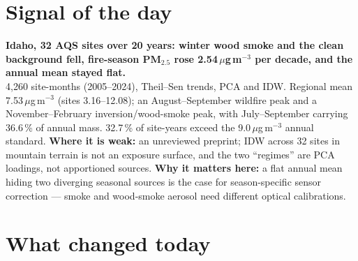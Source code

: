 \documentclass[10pt]{article}
\begin{document}
\vspace{6mm}

\section*{\sffamily\bfseries\color{Deep}Signal of the day}
\vspace{-1.5mm}{\color{Amber}\rule{\linewidth}{1.1pt}}\vspace{2.5mm}

\begin{keybox}
{\sffamily\bfseries\small\color{Deep}Idaho, 32 AQS sites over 20 years: winter wood smoke and the clean
background fell, fire-season PM$_{2.5}$ rose 2.54\,$\mu$g\,m$^{-3}$ per decade, and the annual mean stayed flat.}\\[1.4mm]
\footnotesize
4,260 site-months (2005--2024), Theil--Sen trends, PCA and IDW. Regional mean 7.53\,$\mu$g\,m$^{-3}$ (sites 3.16--12.08);
an August--September wildfire peak and a November--February inversion/wood-smoke peak, with July--September carrying
36.6\,\% of annual mass. 32.7\,\% of site-years exceed the 9.0\,$\mu$g\,m$^{-3}$ annual standard.
\textbf{Where it is weak:} an unreviewed preprint; IDW across 32 sites in mountain terrain is not an exposure surface,
and the two ``regimes'' are PCA loadings, not apportioned sources.
\textbf{Why it matters here:} a flat annual mean hiding two diverging seasonal sources is the case for season-specific
sensor correction --- smoke and wood-smoke aerosol need different optical calibrations.\par
\end{keybox}

\vspace{3mm}

\section*{\sffamily\bfseries\color{Deep}What changed today}
\vspace{-1.5mm}{\color{Amber}\rule{\linewidth}{1.1pt}}\vspace{2.5mm}
\end{document}
